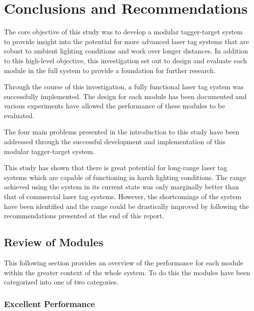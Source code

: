 \chapter{Conclusions and Recommendations}
\label{ch_conclusions}



The core objective of this study was to develop a modular tagger-target system to provide insight into the potential for more advanced laser tag systems that are robust to ambient lighting conditions and work over longer distances. In addition to this high-level objective, this investigation set out to design and evaluate each module in the full system to provide a foundation for further research.

Through the course of this investigation, a fully functional laser tag system was successfully implemented. The design for each module has been documented and various experiments have allowed the performance of these modules to be evaluated.

The four main problems presented in the introduction to this study have been addressed through the successful development and implementation of this modular tagger-target system. 

This study has shown that there is great potential for long-range laser tag systems which are capable of functioning in harsh lighting conditions. The range achieved using the system in its current state was only marginally better than that of commercial laser tag systems. However, the shortcomings of the system have been identified and the range could be drastically improved by following the recommendations presented at the end of this report.

\section{Review of Modules}
This following section provides an overview of the performance for each module within the greater context of the whole system. To do this the modules have been categorized into one of two categories.




\subsection{Excellent Performance}

